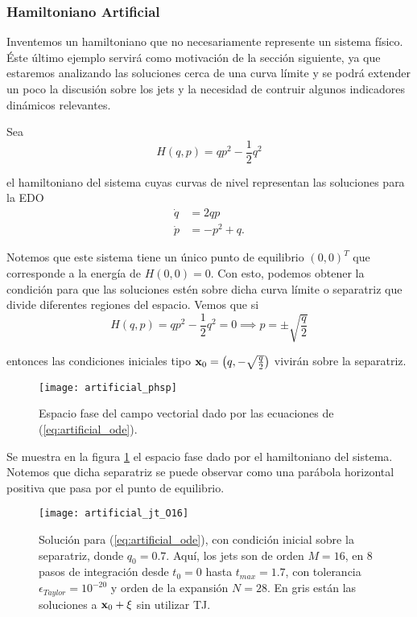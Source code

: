 \subsubsection{Hamiltoniano Artificial}
\label{sec:artificial_ham}

Inventemos un hamiltoniano que no necesariamente represente un sistema físico. Éste último ejemplo servirá como motivación de la sección siguiente, ya que estaremos analizando las soluciones cerca de una curva límite y se podrá extender un poco la discusión sobre los jets y la necesidad de contruir algunos indicadores dinámicos relevantes. 

Sea 
\begin{equation}
 H(q,p) = qp^2 - \frac{1}{2}q^2
 \label{eq:artificial_ham}
\end{equation}

el hamiltoniano del sistema cuyas curvas de nivel representan las soluciones para la EDO
\begin{align}
 \dot{q} &= 2qp \nonumber \\
 \dot{p} &= -p^2 + q.
 \label{eq:artificial_ode}
\end{align}


Notemos que este sistema tiene un único punto de equilibrio $(0,0)^T$ que corresponde a la energía de $H(0,0) = 0$. Con esto, podemos obtener la condición para que las soluciones estén sobre dicha curva límite o separatriz que divide diferentes regiones del espacio. Vemos que si
\begin{equation*}
 H(q,p) = qp^2 - \frac{1}{2}q^2 = 0 \implies p = \pm \sqrt{\frac{q}{2}} 
\end{equation*}

entonces las condiciones iniciales tipo $\mathbf{x}_0 = \left( q, -\sqrt{\frac{q}{2}} \right)$ vivirán sobre la separatriz. 

\begin{figure}[h!]
 \centering
 \texttt{[image: artificial\_phsp]}
 \caption{Espacio fase del campo vectorial dado por las ecuaciones de (\ref{eq:artificial_ode}).}
 \label{fig:artificial_phsp}
\end{figure}

Se muestra en la figura \ref{fig:artificial_phsp} el espacio fase dado por el hamiltoniano del sistema. Notemos que dicha separatriz se puede observar como una parábola horizontal positiva que pasa por el punto de equilibrio.

\begin{figure}[h!]
 \centering
 \texttt{[image: artificial\_jt\_O16]}
 \caption{Solución para (\ref{eq:artificial_ode}), con condición inicial sobre la separatriz, donde $q_0 = 0.7$. Aquí, los jets son de orden $M=16$, en $8$ pasos de integración desde $t_0 = 0$ hasta $t_{max} = 1.7$, con tolerancia $\epsilon_{Taylor} = 10^{-20}$ y orden de la expansión $N=28$. En gris están las soluciones a $\mathbf{x}_0 + \xi$ sin utilizar TJ.}
 \label{fig:artificial_jt}
\end{figure}

